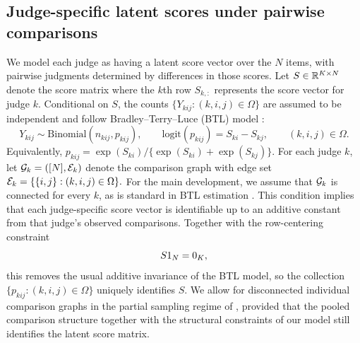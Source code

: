 \documentclass{article}
\begin{document}
\begin{bibunit}[unsrtnat]
\subsection{Judge-specific latent scores under pairwise comparisons}
We model each judge as having a latent score vector over the $N$ items, with pairwise judgments determined by differences in those scores. 
Let $S\in\mathbb{R}^{K\times N}$ denote the score matrix where the $k$th row $S_{k,:}$ represents the score vector for judge $k$.
Conditional on $S$, the counts $\{Y_{kij}:(k,i,j)\in\Omega\}$ are assumed to be independent and follow Bradley--Terry--Luce (BTL) model \citep{bradley1952rank,luce1959individual}:
\begin{equation}
    Y_{kij}\sim \mathrm{Binomial}(n_{kij},p_{kij}), \qquad \mathrm{logit}(p_{kij})=S_{ki}-S_{kj}, \qquad (k,i,j)\in\Omega. \label{eq:binomial-model}
\end{equation}
Equivalently, \(p_{kij}={\exp(S_{ki})}/\{\exp(S_{ki})+\exp(S_{kj})\}.\)
For each judge $k$, let $\mathcal{G}_k=([N],\mathcal{E}_k)$ denote the comparison graph with edge set
\(
\mathcal{E}_k=\{\{i,j\}:(k,i,j)\in\Omega\}.
\)
For the main development, we assume that $\mathcal{G}_k$ is connected for every $k$, as is standard in BTL estimation \citep{hunter2004mm}. 
This condition implies that each judge-specific score vector is identifiable up to an additive constant from that judge's observed comparisons. Together with the row-centering constraint
\begin{equation}
    S 1_N = 0_K,
    \label{eq:S-id}
\end{equation}
this removes the usual additive invariance of the BTL model, so the collection $\{p_{kij}:(k,i,j)\in\Omega\}$ uniquely identifies $S$.
We allow for disconnected individual comparison graphs in the partial sampling regime of , provided that the pooled comparison structure together with the structural constraints of our model still identifies the latent score matrix.



\end{bibunit}
\end{document}
